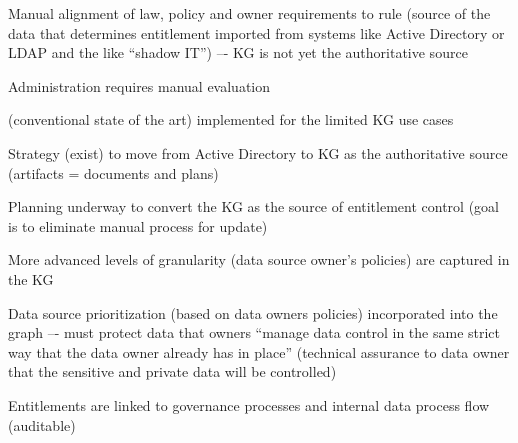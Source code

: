 \kgmmscoringsection

\kgmmscoringlevelOne

\begin{scoring}

  \item Manual alignment of law, policy and owner requirements to rule (source of the data that determines entitlement
        imported from systems like Active Directory or LDAP and the like “shadow IT”) –-
        KG is not yet the authoritative source
  \item Administration requires manual evaluation
  \item {} (conventional state of the art) implemented for the limited KG use cases

\end{scoring}

\kgmmscoringlevelTwo

\begin{scoring}

  \item Strategy (exist) to move from Active Directory to KG as the authoritative source
        (artifacts = documents and plans)
  \item Planning underway to convert the KG as the source of entitlement control
        (goal is to eliminate manual process for update)
  \item More advanced levels of granularity (data source owner’s policies) are captured in the KG
  \item Data source prioritization (based on data owners policies) incorporated into the graph –-
        must protect data that owners “manage data control in the same strict way that the data owner
        already has in place” (technical assurance to data owner that the sensitive and private data will be controlled)
  \item Entitlements are linked to governance processes and internal data process flow (auditable)

\end{scoring}

\kgmmscoringlevelThree

